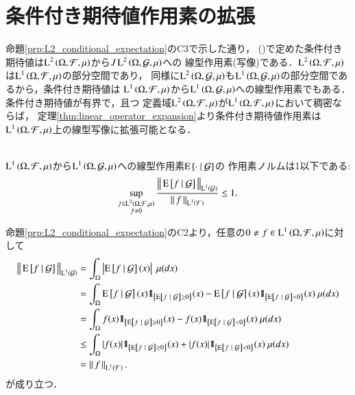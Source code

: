 	
\section{条件付き期待値作用素の拡張}
	命題\ref{prp:L2_conditional_expectation}のC3で示した通り，
	()で定めた条件付き期待値は$\operatorname{L}^{2} \left(\Omega,\mathcal{F},\mu\right)$から$J\operatorname{L}^{2} \left(\Omega,\mathcal{G},\mu\right)$への
	線型作用素(写像)である．$\operatorname{L}^{2} \left(\Omega,\mathcal{F},\mu\right)$は$\operatorname{L}^{1} \left(\Omega,\mathcal{F},\mu\right)$の部分空間であり，
	同様に$\operatorname{L}^{2} \left(\Omega,\mathcal{G},\mu\right)$も$\operatorname{L}^{1} \left(\Omega,\mathcal{G},\mu\right)$の部分空間であるから，条件付き期待値は
	$\operatorname{L}^{1} \left(\Omega,\mathcal{F},\mu\right)$から$\operatorname{L}^{1} \left(\Omega,\mathcal{G},\mu\right)$への線型作用素でもある．
	条件付き期待値が有界で，且つ
	定義域$\operatorname{L}^{2} \left(\Omega,\mathcal{F},\mu\right)$が$\operatorname{L}^{1} \left(\Omega,\mathcal{F},\mu\right)$において稠密ならば，
	定理\ref{thm:linear_operator_expansion}より条件付き期待値作用素は$\operatorname{L}^{1} \left(\Omega,\mathcal{F},\mu\right)$上の線型写像に拡張可能となる．
	
	\begin{screen}
		\begin{lem}[条件付き期待値作用素の有界性]\mbox{}\\
			$\operatorname{L}^{1} \left(\Omega,\mathcal{F},\mu\right)$から$\operatorname{L}^{1} \left(\Omega,\mathcal{G},\mu\right)$への線型作用素$\operatorname{E} \left[ \cdot \ \middle|\ \mathcal{G} \right]$の
			作用素ノルムは1以下である:
			\begin{align}
				\operatorname*{sup}_{\substack{f \in \operatorname{L}^{2} \left(\Omega,\mathcal{F},\mu\right) \\ f \neq 0}} \frac{ \left\|\, \operatorname{E} \left[ f \ \middle|\ \mathcal{G} \right]\, \right\|_{\operatorname{L}^{1} \left(\mathcal{G}\right)} }{ \left\|\, f\, \right\|_{\operatorname{L}^{1} \left(\mathcal{F}\right)} } \leq 1.
			\end{align}
			\label{lem:conditional_exp_bound}
		\end{lem}
	\end{screen}
	
	\begin{prf}
		命題\ref{prp:L2_conditional_expectation}のC2より，任意の$0 \neq f \in \operatorname{L}^{1} \left(\Omega,\mathcal{F},\mu\right)$に対して
		\begin{align}
			\Norm{\cexp{f}{\mathcal{G}}}{\Lp{1}{\mathcal{G}}} 
			&= \int_\Omega \left| \cexp{f}{\mathcal{G}}(x) \right|\ \mu(dx) \\
			&= \int_\Omega \cexp{f}{\mathcal{G}}(x) \defunc_{\left\{ \cexp{f}{\mathcal{G}} \geq 0\right \}}(x) 
				- \cexp{f}{\mathcal{G}}(x) \defunc_{\left\{ \cexp{f}{\mathcal{G}} < 0\right\} }(x)\ \mu(dx) \\
			&= \int_\Omega f(x) \defunc_{\left\{ \cexp{f}{\mathcal{G}} \geq 0\right\} }(x) - f(x) \defunc_{\left\{ \cexp{f}{\mathcal{G}} < 0\right\} }(x)\ \mu(dx) \\
			&\leq \int_\Omega |f(x)| \defunc_{\left\{ \cexp{f}{\mathcal{G}} \geq 0\right\} }(x) + |f(x)| \defunc_{\left\{ \cexp{f}{\mathcal{G}} < 0\right\} }(x)\ \mu(dx) \\
			&= \Norm{f}{\Lp{1}{\mathcal{F}}}.
		\end{align}
		が成り立つ．
		\QED
	\end{prf}
	
